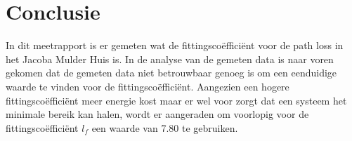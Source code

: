 \section{Conclusie}
In dit meetrapport is er gemeten wat de fittingscoëfficiënt voor de path loss in het Jacoba Mulder Huis is. In de analyse van de gemeten data is naar voren gekomen dat de gemeten data niet betrouwbaar genoeg is om een eenduidige waarde te vinden voor de fittingscoëfficiënt. Aangezien een hogere fittingscoëfficiënt meer energie kost maar er wel voor zorgt dat een systeem het minimale bereik kan halen, wordt er aangeraden om voorlopig voor de fittingscoëfficiënt $l_f$ een waarde van 7.80 te gebruiken. 
